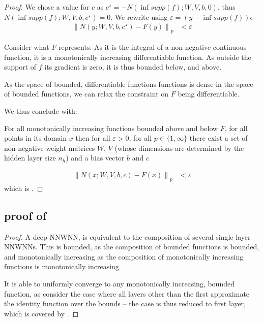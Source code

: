 \documentclass{article} %
\begin{document}
\begin{proof}

We chose a value for $c$ as $c^\star=-N(\inf supp(f);W,V,b, 0)$, thus $N(\inf supp(f);W,V,b, c^\star)=0$.
We rewrite using $\varepsilon = \left( y-\inf supp(f) \right)  \epsilon$
\begin{align}
\left\| N(y;W,V,b, c^\star) - F(y) \right\|_p &< \varepsilon
\end{align}

Consider what $F$ represents.
As it is the integral of a non-negative continuous function, it is a monotonically increasing differentiable function.
As outside the support of $f$ its gradient is zero, it is thus bounded below, and above.

As the space of bounded, differentiable functions functions is dense in the space of bounded functions, we can relax the constraint on $F$ being differentiable.

We thus conclude with:

For all monotonically increasing functions bounded above and below $F$,
for all points in its domain $x$
then for all $\varepsilon > 0$, for all $p\in \lbrace 1, \infty \rbrace$
there exist a set of non-negative weight matrices $W$, $V$ (whose dimensions are determined by the hidden layer size $n_h$) and a bias vector $b$ and $c$

\begin{align}
\left\| N(x;W,V,b, c) - F(x) \right\|_p &< \varepsilon
\end{align}
which is .
\end{proof}

\subsection{proof of }
\begin{proof}
A deep NNWNN, is equivalent to the composition of several single layer NNWNNs.
This is bounded, as the composition of bounded functions is bounded,
and monotonically increasing as the composition of monotonically increasing functions is monotonically increasing.

It is able to uniformly converge to any monotonically increasing, bounded function,
as consider the case where all layers other than the first approximate the identity function over the bounds -- the case is thus reduced to first layer, which is covered by .
\end{proof}
\end{document}
